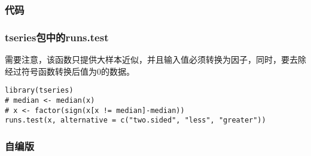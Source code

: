 \subsubsection{代码}
\subsubsection{tseries包中的runs.test}
需要注意，该函数只提供大样本近似，并且输入值必须转换为因子，同时，要去除经过符号函数转换后值为$0$的数据。
\begin{verbatim}
library(tseries)
# median <- median(x)
# x <- factor(sign(x[x != median]-median))
runs.test(x, alternative = c("two.sided", "less", "greater"))
\end{verbatim}
\subsubsection{自编版}
\inputminted[bgcolor=white, linenos, frame=single, numbersep=5pt, breaklines]{r}{nonparametric-statistics/chapter4/runs-test.R}